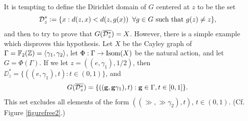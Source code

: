 \begin{remark}
It is tempting to define the Dirichlet domain of $G$ centered at $z$ to be the set
\[
\mathcal D_z^* := \{ x : d(z,x) < d(z,g(x)) \;\;\forall g\in G \textup{ such that }g(z)\neq z\},
\]
and then to try to prove that $G(\overline{\mathcal D_z^*}) = X$. However, there is a simple example which disproves this hypothesis. Let $X$ be the Cayley graph of $\Gamma = \F_2(\Z) = \lb \gamma_1,\gamma_2\rb$, let $\Phi:\Gamma\to\operatorname{Isom}(X)$ be the natural action, and let $G = \Phi(\Gamma)$. If we let $z = ((e,\gamma_1),1/2)$, then $\DD_z^* = \{((e,\gamma_1),t) : t\in (0,1)\}$, and
\[
G(\overline{\mathcal D_z^*}) = \{((\mathbf g,\mathbf g\gamma_1),t) : \mathbf g\in\Gamma,t\in[0,1]\}.
\]
This set excludes all elements of the form $((\gg,\gg\gamma_2),t)$, $t\in (0,1)$. (Cf. Figure \ref{figurefree2}.)
\end{remark}


